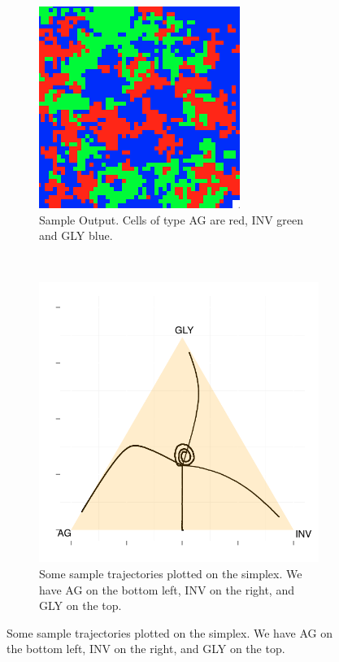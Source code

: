 \documentclass[12pt]{report}
\begin{document}
\begin{figure}[H]
\centering
\begin{subfigure}[b]{0.4 \textwidth}
	\includegraphics[width = 0.9 \textwidth]{Diagrams/Basanta/sample}
	\caption{Sample Output. Cells of type AG are red, INV green and GLY blue.}
\end{subfigure}
~
\begin{subfigure}[b]{0.4 \linewidth}
\includegraphics[width = 0.9 \linewidth]{Diagrams/basanta_trajectories}
\caption{Some sample trajectories plotted on the simplex. We have AG on the bottom left, INV on the right, and GLY on the top. }
\end{subfigure}
\end{figure}
  	
\end{document}

